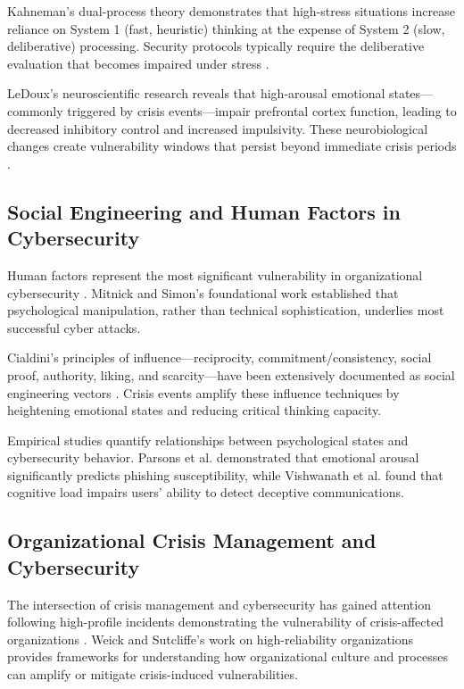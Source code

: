 \documentclass[11pt,a4paper]{article}
\begin{document}
Kahneman's \cite{kahneman2011} dual-process theory demonstrates that high-stress situations increase reliance on System 1 (fast, heuristic) thinking at the expense of System 2 (slow, deliberative) processing. Security protocols typically require the deliberative evaluation that becomes impaired under stress \cite{anderson2016}.

LeDoux's \cite{ledoux2000} neuroscientific research reveals that high-arousal emotional states—commonly triggered by crisis events—impair prefrontal cortex function, leading to decreased inhibitory control and increased impulsivity. These neurobiological changes create vulnerability windows that persist beyond immediate crisis periods \cite{mather2017}.

\subsection{Social Engineering and Human Factors in Cybersecurity}

Human factors represent the most significant vulnerability in organizational cybersecurity \cite{schneier2008}. Mitnick and Simon's \cite{mitnick2002} foundational work established that psychological manipulation, rather than technical sophistication, underlies most successful cyber attacks.

Cialdini's \cite{cialdini2021} principles of influence—reciprocity, commitment/consistency, social proof, authority, liking, and scarcity—have been extensively documented as social engineering vectors \cite{hadnagy2018, mouton2016}. Crisis events amplify these influence techniques by heightening emotional states and reducing critical thinking capacity.

Empirical studies quantify relationships between psychological states and cybersecurity behavior. Parsons et al. \cite{parsons2014} demonstrated that emotional arousal significantly predicts phishing susceptibility, while Vishwanath et al. \cite{vishwanath2018} found that cognitive load impairs users' ability to detect deceptive communications.

\subsection{Organizational Crisis Management and Cybersecurity}

The intersection of crisis management and cybersecurity has gained attention following high-profile incidents demonstrating the vulnerability of crisis-affected organizations \cite{woods2017}. Weick and Sutcliffe's \cite{weick2015} work on high-reliability organizations provides frameworks for understanding how organizational culture and processes can amplify or mitigate crisis-induced vulnerabilities.
\end{document}
